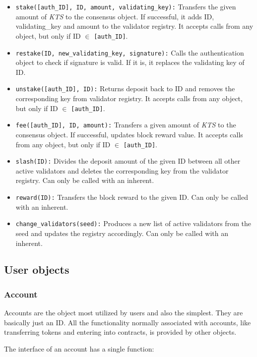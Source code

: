 \documentclass[conference]{IEEEtran}
\begin{document}
\begin{itemize}
	\item \texttt{stake([auth\_ID], ID, amount, validating\_key):} Transfers the given amount of \textit{KTS} to the consensus object. If successful, it adds ID, validating\_key and amount to the validator registry. It accepts calls from any object, but only if ID $\in$ \texttt{\texttt{[auth\_ID]}}.
	\item \texttt{restake(ID, new\_validating\_key, signature):} Calls the authentication object to check if signature is valid. If it is, it replaces the validating key of ID.
	\item \texttt{unstake([auth\_ID], ID):} Returns deposit back to ID and removes the corresponding key from validator registry. It accepts calls from any object, but only if ID $\in$ \texttt{[auth\_ID]}.
	\item \texttt{fee([auth\_ID], ID, amount):} Transfers a given amount of \textit{KTS} to the consensus object. If successful, updates block reward value. It accepts calls from any object, but only if ID $\in$ \texttt{[auth\_ID]}.
	\item \texttt{slash(ID):} Divides the deposit amount of the given ID between all other active validators and deletes the corresponding key from the validator registry. Can only be called with an inherent.
	\item \texttt{reward(ID):} Transfers the block reward to the given ID. Can only be called with an inherent.
	\item \texttt{change\_validators(seed):} Produces a new list of active validators from the seed and updates the registry accordingly. Can only be called with an inherent.
\end{itemize}

\subsection{User objects}

\subsubsection{Account}
Accounts are the object most utilized by users and also the simplest. They are basically just an ID. All the functionality normally associated with accounts, like transferring tokens and entering into contracts, is provided by other objects.

The interface of an account has a single function:
\end{document}

